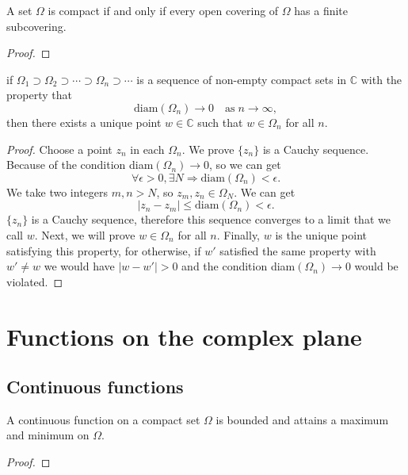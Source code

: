 \begin{theorem}
    A set $\Omega$ is compact if and only if every open covering of
    $\Omega$ has a finite subcovering.
\end{theorem}
\begin{proof}
\end{proof}

\begin{proposition}
    if $\Omega_1\supset\Omega_2\supset\cdots\supset\Omega_n\supset\cdots$ is a sequence
    of non-empty compact sets in $\mathbb{C}$ with the property that
    \[
        \text{diam}(\Omega_n)\to 0\quad\text{as}\; n\to\infty,
    \]
    then there exists a unique point $w\in\mathbb{C}$ such
    that $w\in\Omega_n$ for all $n$.
\end{proposition}
\begin{proof}
    Choose a point $z_n$ in each $\Omega_n$. We prove $\{z_n\}$ is a Cauchy sequence.
    Because of the condition diam$(\Omega_n)\to 0$, so we can get
    \[
        \forall \epsilon>0, \exists N\Rightarrow \text{diam}(\Omega_n)<\epsilon.
    \]
    We take two integers $m,n>N$, so $z_m,z_n\in\Omega_N$. We can get
    \[
        |z_n-z_m|\le \text{diam}(\Omega_n)<\epsilon.
    \]
    $\{z_n\}$ is a Cauchy sequence, therefore this sequence converges to a limit that
    we call $w$. Next, we will prove $w\in \Omega_n$ for all $n$. Finally, $w$ is the
    unique point satisfying this property, for otherwise, if $w'$ satisfied the same
    property with $w'\ne w$ we would have $|w-w'|>0$ and the
    condition diam$(\Omega_n)\to 0$ would be violated.
\end{proof}





\section{Functions on the complex plane}

\subsection{Continuous functions}

\begin{theorem}
    A continuous function on a compact set $\Omega$ is bounded and attains
    a maximum and minimum on $\Omega$.
\end{theorem}
\begin{proof}
    
\end{proof}

